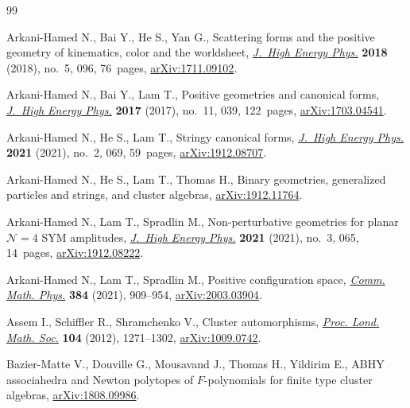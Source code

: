 \documentclass[10pt,a4paper]{amsart}
\numberwithin{equation}{section}
\begin{document}

\begin{thebibliography}{99}
\footnotesize\itemsep=0pt

Arkani-Hamed N., Bai Y., He S., Yan G., Scattering forms and the positive
 geometry of kinematics, color and the worldsheet, \href{https://doi.org/10.1007/jhep05(2018)096}{\textit{J.~High Energy
 Phys.}} \textbf{2018} (2018), no.~5, 096, 76~pages, \href{https://arxiv.org/abs/1711.09102}{arXiv:1711.09102}.

Arkani-Hamed N., Bai Y., Lam T., Positive geometries and canonical forms,
 \href{https://doi.org/10.1007/jhep11(2017)039}{\textit{J.~High Energy Phys.}} \textbf{2017} (2017), no.~11, 039, 122~pages,
 \href{https://arxiv.org/abs/1703.04541}{arXiv:1703.04541}.

Arkani-Hamed N., He S., Lam T., Stringy canonical forms, \href{https://doi.org/10.1007/jhep02(2021)069}{\textit{J.~High Energy
 Phys.}} \textbf{2021} (2021), no.~2, 069, 59~pages, \href{https://arxiv.org/abs/1912.08707}{arXiv:1912.08707}.

Arkani-Hamed N., He S., Lam T., Thomas H., Binary geometries, generalized
 particles and strings, and cluster algebras, \href{https://arxiv.org/abs/1912.11764}{arXiv:1912.11764}.

Arkani-Hamed N., Lam T., Spradlin M., Non-perturbative geometries for planar
 {${\mathcal N} = 4$} {SYM} amplitudes, \href{https://doi.org/10.1007/jhep03(2021)065}{\textit{J.~High Energy Phys.}}
 \textbf{2021} (2021), no.~3, 065, 14~pages, \href{https://arxiv.org/abs/1912.08222}{arXiv:1912.08222}.

Arkani-Hamed N., Lam T., Spradlin M., Positive configuration space,
 \href{https://doi.org/10.1007/s00220-021-04041-x}{\textit{Comm. Math. Phys.}} \textbf{384} (2021), 909--954,
 \href{https://arxiv.org/abs/2003.03904}{arXiv:2003.03904}.

Assem I., Schiffler R., Shramchenko V., Cluster automorphisms, \href{https://doi.org/10.1112/plms/pdr049}{\textit{Proc.
 Lond. Math. Soc.}} \textbf{104} (2012), 1271--1302, \href{https://arxiv.org/abs/1009.0742}{arXiv:1009.0742}.

Bazier-Matte V., Douville G., Mousavand J., Thomas H., Yildirim E., {ABHY}
 associahedra and {N}ewton polytopes of {$F$}-polynomials for finite type
 cluster algebras, \href{https://arxiv.org/abs/1808.09986}{arXiv:1808.09986}.


\end{thebibliography}
\end{document}

